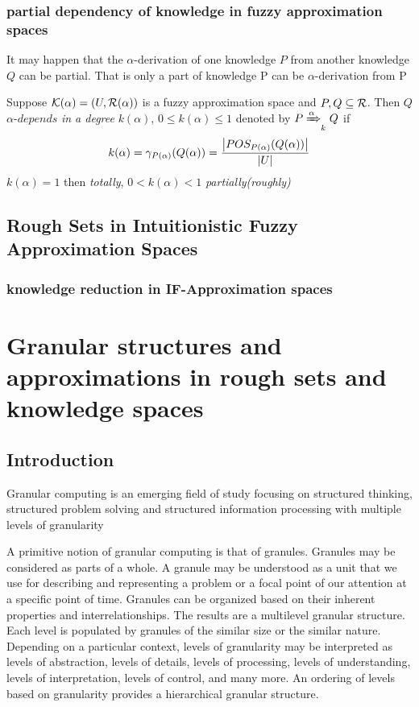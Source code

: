 \documentclass[11pt]{article}
\begin{document}
\subsubsection{partial dependency of knowledge in fuzzy approximation spaces}
\label{sec:org90981a0}
It may happen that the \(\alpha\text{-derivation}\) of one knowledge \(P\) from
another knowledge \(Q\) can be partial. That is only a part of knowledge P can
be \(\alpha\text{-derivation}\) from P 

Suppose \(\mathcal{K}(\alpha)=(U,\mathcal{R}(\alpha))\) is a fuzzy approximation space and
\(P,Q\subseteq \mathcal{R}\). Then \(Q\) \(\alpha\textit{-depends}\) \emph{in a degree}
\(k(\alpha)\), \(0\le k(\alpha)\le 1\) denoted by \(P\xRightarrow{\alpha}_{k}Q\)
if 
\begin{equation*}
k(\alpha)=\gamma_{P(\alpha)}(Q(\alpha))=\frac{\abs{POS_{P(\alpha)}(Q(\alpha))}}{\abs{U}}
\end{equation*}
\(k(\alpha)=1\) then \emph{totally}, \(0<k(\alpha)<1\) \emph{partially(roughly)}

\subsection{Rough Sets in Intuitionistic Fuzzy Approximation Spaces}
\label{sec:orgd782ddf}
\subsubsection{knowledge reduction in IF-Approximation spaces}
\label{sec:orgd76166b}
\section{Granular structures and approximations in rough sets and knowledge spaces}
\label{sec:orgd0d8637}
\subsection{Introduction}
\label{sec:org1343657}
Granular computing is an emerging field of study focusing on structured
thinking, structured problem solving and structured information processing
with multiple levels of granularity 

A primitive notion of granular computing is that of granules. Granules may
be considered as parts of a whole. A granule may be understood as a unit
that we use for describing and representing a problem or a focal point of
our attention at a specific point of time. Granules can be organized based
on their inherent properties and interrelationships. The results are a
multilevel granular structure. Each level is populated by granules of the
similar size or the similar nature. Depending on a particular context,
levels of granularity may be interpreted as levels of abstraction, levels of
details, levels of processing, levels of understanding, levels of
interpretation, levels of control, and many more. An ordering of levels
based on granularity provides a hierarchical granular structure. 
\end{document}
